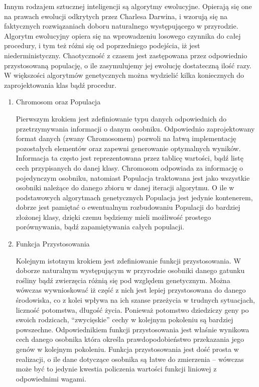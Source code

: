 \begin{par}
Innym rodzajem sztucznej inteligencji są algorytmy ewolucyjne.
Opierają się one na prawach ewolucji odkrytych przez Charlesa Darwina, i wzorują się na faktycznych rozwiązaniach doboru naturalnego występującego w przyrodzie.
Algorytm ewolucyjny opiera się na wprowadzeniu losowego czynnika do całej procedury, i tym też różni się od poprzedniego podejścia, iż jest niederministyczny. 
Chaotyczność z czasem jest zastępowana przez odpowiednio przystosowaną populację, o ile zasymulujemy jej ewolucję dostateczną ilość razy. 
W większości algorytmów genetycznych można wydzielić kilka koniecznych do zaprojektowania klas bądź procedur.
\begin{enumerate}
\item Chromosom oraz Populacja
	\begin{par}
		Pierwszym krokiem jest zdefiniowanie typu danych odpowiednich do przetrzymywania informacji o danym osobniku.
		Odpowiednio zaprojektowany format danych (zwany Chromosomem) pozwoli na łatwą implementację pozostałych elementów oraz zapewni generowanie optymalnych wyników.
		Informacja ta często jest reprezentowana przez tablicę wartości, bądź listę cech przypisanych do danej klasy. 
		Chromosom odpowiada za informację o pojedynczym osobniku, natomiast Populacja traktowana jest jako wszystkie osobniki należące do danego zbioru w danej iteracji algorytmu. O ile w podstawowych algorytmach genetycznych Populacja jest jedynie kontenerem, dobrze jest pamiętać o ewentualnym rozbudowaniu Populacji do bardziej złożonej klasy, dzięki czemu będziemy mieli możliwość prostego porównywania, bądź zapamiętywania całych populacji.
	\end{par}
\item Funkcja Przystosowania
	\begin{par}
		Kolejnym istotnym krokiem jest zdefiniowanie funkcji przystosowania.
		W doborze naturalnym występującym w przyrodzie osobniki danego gatunku rośliny bądź zwierzęcia różnią się pod względem genetycznym. 
		Można wówczas wywnioskować iż część z nich jest lepiej przystosowana do danego środowiska, co z kolei wpływa na ich szanse przeżycia w trudnych sytuacjach, liczność potomstwa, długość życia.
		Ponieważ potomstwo dziedziczy geny po swoich rodzicach, ``zwycięskie'' cechy w kolejnym pokoleniu są bardziej powszechne.
		Odpowiednikiem funkcji przystosowania jest właśnie wynikowa cech danego osobnika która określa prawdopodobieństwo przekazania jego genów w kolejnym pokoleniu.
		Funkcja przystosowania jest dość prosta w realizacji, o ile dane dotyczące osobnika są łatwe do zmierzenia -- wówczas może być to jedynie kwestia policzenia wartości funkcji liniowej z odpowiednimi wagami.

\end{par}
\end{enumerate}
\end{par}
